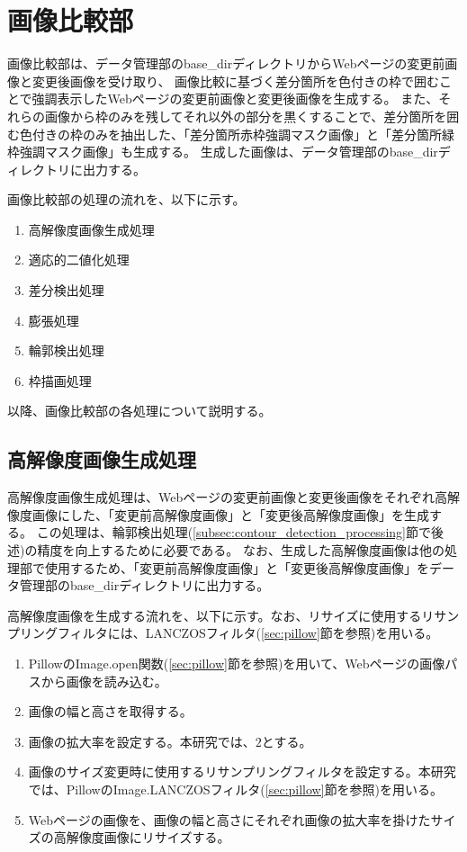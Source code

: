 \section{画像比較部}\label{sec:Difference_extraction_section}
画像比較部は、データ管理部のbase\_dirディレクトリからWebページの変更前画像と変更後画像を受け取り、
画像比較に基づく差分箇所を色付きの枠で囲むことで強調表示したWebページの変更前画像と変更後画像を生成する。
また、それらの画像から枠のみを残してそれ以外の部分を黒くすることで、差分箇所を囲む色付きの枠のみを抽出した、「差分箇所赤枠強調マスク画像」と「差分箇所緑枠強調マスク画像」も生成する。
生成した画像は、データ管理部のbase\_dirディレクトリに出力する。
\par
画像比較部の処理の流れを、以下に示す。
\begin{enumerate}
    \item 高解像度画像生成処理
    \item 適応的二値化処理
    \item 差分検出処理
    \item 膨張処理
    \item 輪郭検出処理
    \item 枠描画処理
\end{enumerate}
以降、画像比較部の各処理について説明する。

\subsection{高解像度画像生成処理}\label{subsec:Generate_high_images}
高解像度画像生成処理は、Webページの変更前画像と変更後画像をそれぞれ高解像度画像にした、「変更前高解像度画像」と「変更後高解像度画像」を生成する。
この処理は、輪郭検出処理(\ref{subsec:contour_detection_processing}節で後述)の精度を向上するために必要である。
なお、生成した高解像度画像は他の処理部で使用するため、「変更前高解像度画像」と「変更後高解像度画像」をデータ管理部のbase\_dirディレクトリに出力する。
\par
高解像度画像を生成する流れを、以下に示す。なお、リサイズに使用するリサンプリングフィルタには、LANCZOSフィルタ(\ref{sec:pillow}節を参照)を用いる。
\begin{enumerate}
    \item PillowのImage.open関数(\ref{sec:pillow}節を参照)を用いて、Webページの画像パスから画像を読み込む。
    \item 画像の幅と高さを取得する。
    \item 画像の拡大率を設定する。本研究では、$2$とする。
    \item 画像のサイズ変更時に使用するリサンプリングフィルタを設定する。本研究では、PillowのImage.LANCZOSフィルタ(\ref{sec:pillow}節を参照)を用いる。
    \item Webページの画像を、画像の幅と高さにそれぞれ画像の拡大率を掛けたサイズの高解像度画像にリサイズする。
\end{enumerate}

